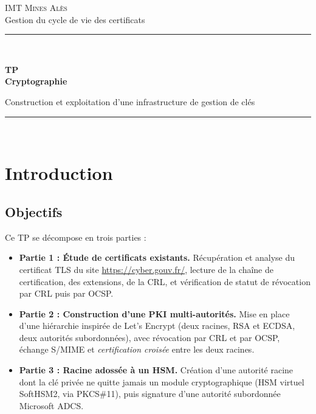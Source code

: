 \documentclass[11pt,a4paper]{article}
\begin{document}
\begin{titlepage}
\centering
\vspace*{1.5cm}
{\Large\scshape IMT Mines Alès}\\[0.3cm]
{\large Gestion du cycle de vie des certificats}\\[2cm]

\rule{\linewidth}{0.5pt}\\[0.4cm]
{\Huge\bfseries TP\\[0.3cm]Cryptographie\par}
\vspace{0.4cm}
{\large Construction et exploitation d'une infrastructure de gestion de clés\par}
\rule{\linewidth}{0.5pt}\\[1.5cm]

\end{titlepage}

\tableofcontents
\newpage

\section{Introduction}

\subsection{Objectifs}
Ce TP se décompose en trois parties :
\begin{itemize}[leftmargin=1.4em]
  \item \textbf{Partie 1 : Étude de certificats existants.} Récupération et analyse
  du certificat TLS du site \url{https://cyber.gouv.fr/}, lecture de la chaîne de
  certification, des extensions, de la CRL, et vérification de statut de révocation
  par CRL puis par OCSP.
  \item \textbf{Partie 2 : Construction d'une PKI multi-autorités.} Mise en place
  d'une hiérarchie inspirée de Let's Encrypt (deux racines, RSA et ECDSA, deux
  autorités subordonnées), avec révocation par CRL et par OCSP, échange S/MIME et
  \emph{certification croisée} entre les deux racines.
  \item \textbf{Partie 3 : Racine adossée à un HSM.} Création d'une autorité racine
  dont la clé privée ne quitte jamais un module cryptographique (HSM virtuel
  SoftHSM2, via PKCS\#11), puis signature d'une autorité subordonnée Microsoft ADCS.
\end{itemize}
\end{document}
